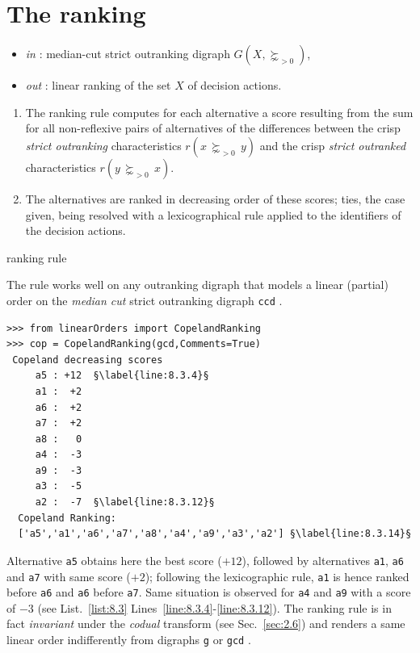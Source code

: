 \section{The \Copeland ranking}
\label{sec:8.2}

\begin{algorithm}
    {\footnotesize
\begin{itemize}
 \item [] \emph{in} : median-cut strict outranking digraph $G(X,\succnsim_{>0})$,
 \item [] \emph{out} : linear ranking of the set $X$ of decision actions.
\end{itemize}
  \begin{enumerate}
    \item The \Copeland ranking rule computes for each alternative a score resulting from the sum for all non-reflexive pairs of alternatives of the differences between the crisp \emph{strict outranking} characteristics $r(x\, \succnsim_{>0} \,y)$ and the crisp \emph{strict outranked} characteristics $r(y\, \succnsim_{>0} \, x)$.
    \item  The alternatives are ranked in decreasing order of these scores; ties, the case given, being resolved with a lexicographical rule applied to the identifiers of the decision actions. 
    \end{enumerate}
    }
    \caption{\Copeland ranking rule \citep{COP-1951}}
\label{alg:8.1}
\end{algorithm}

The \Copeland rule works well on any outranking digraph that models a linear (partial) order on the \emph{median cut} strict outranking digraph \texttt{ccd} \citep{DIA-2010}. 
\begin{lstlisting}[caption={Computing a \Copeland Ranking},label=list:8.3]
>>> from linearOrders import CopelandRanking
>>> cop = CopelandRanking(gcd,Comments=True)
 Copeland decreasing scores
     a5 : +12  §\label{line:8.3.4}§
     a1 :  +2
     a6 :  +2
     a7 :  +2
     a8 :   0
     a4 :  -3
     a9 :  -3
     a3 :  -5
     a2 :  -7  §\label{line:8.3.12}§
  Copeland Ranking:
  ['a5','a1','a6','a7','a8','a4','a9','a3','a2'] §\label{line:8.3.14}§
\end{lstlisting}

Alternative \texttt{a5} obtains here the best \Copeland score ($+12$), followed by alternatives \texttt{a1}, \texttt{a6} and \texttt{a7} with same score ($+2$); following the lexicographic rule, \texttt{a1} is hence ranked before \texttt{a6} and \texttt{a6} before \texttt{a7}. Same situation is observed for \texttt{a4} and \texttt{a9} with a score of $-3$ (see List.~\vref{list:8.3} Lines~\ref{line:8.3.4}-\ref{line:8.3.12}). The \Copeland ranking rule is in fact \emph{invariant} under the \emph{codual} transform (see Sec.~\ref{sec:2.6}) and renders a same linear order indifferently from digraphs \texttt{g} or \texttt{gcd} .

